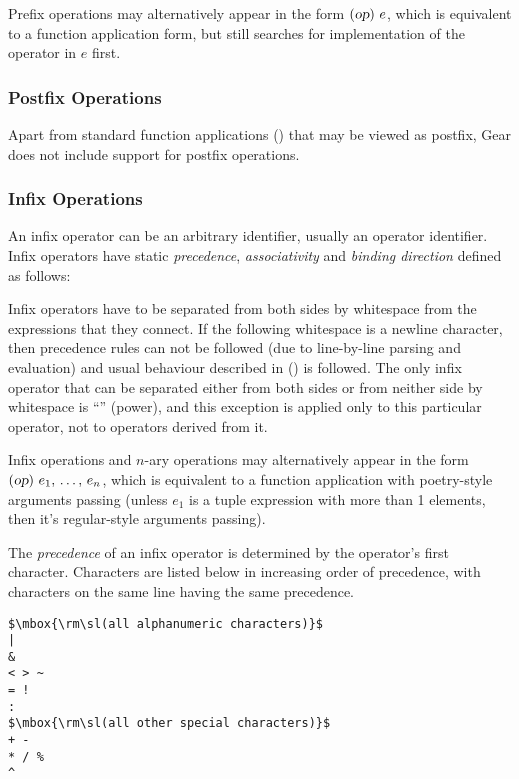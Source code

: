 Prefix operations may alternatively appear in the form $(\mbox{\sl op})\ e$, which is equivalent to a function application form, but still searches for implementation of the operator in $e$ first. 





\subsubsection{Postfix Operations}

Apart from standard function applications () that may be viewed as postfix, Gear does not include support for postfix operations. 





\subsubsection{Infix Operations}
\label{sec:infix-operations}

An infix operator can be an arbitrary identifier, usually an operator identifier. Infix operators have static {\em precedence}, {\em associativity} and {\em binding direction} defined as follows:

Infix operators have to be separated from both sides by whitespace from the expressions that they connect. If the following whitespace is a newline character, then precedence rules can not be followed (due to line-by-line parsing and evaluation) and usual behaviour described in () is followed. The only infix operator that can be separated either from both sides or from neither side by whitespace is ``\code{^}'' (power), and this exception is applied only to this particular operator, not to operators derived from it. 

Infix operations and $n$-ary operations may alternatively appear in the form $(\mbox{\sl op})\ e_1 ,\, \ldots ,\, e_n$, which is equivalent to a function application with poetry-style arguments passing (unless $e_1$ is a tuple expression with more than 1 elements, then it's regular-style arguments passing). 

The {\em precedence} of an infix operator is determined by the operator's first character. Characters are listed below in increasing order of precedence, with characters on the same line having the same precedence.

\begin{lstlisting}
$\mbox{\rm\sl(all alphanumeric characters)}$
|
&
< > ~
= !
:
$\mbox{\rm\sl(all other special characters)}$
+ -
* / %
^
\end{lstlisting}

